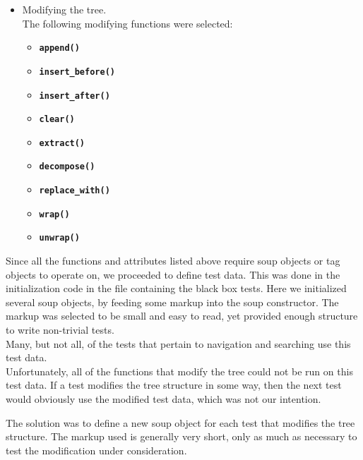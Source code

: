 \documentclass[10pt]{article}
\newcommand{\tbt}[1]{\texttt{\textbf{#1}}}
\begin{document}
\begin{itemize}
  \item Modifying the tree. \\
  The following modifying functions were selected:
    \begin{itemize}
    \setlength\itemsep{-0.05em}
      \item \tbt{append()}
      \item \tbt{insert\_before()}
      \item \tbt{insert\_after()}
      \item \tbt{clear()}
      \item \tbt{extract()}
      \item \tbt{decompose()}
      \item \tbt{replace\_with()}
      \item \tbt{wrap()}
      \item \tbt{unwrap()}
    \end{itemize}
\end{itemize}


Since all the functions and attributes listed above require soup objects or tag objects to operate on, we proceeded to define test data. This was done in the initialization code in the file containing the black box tests. Here we initialized several soup objects, by feeding some markup into the soup constructor. The markup was selected to be small and easy to read, yet provided enough structure to write non-trivial tests.  \\ 

Many, but not all, of the tests that pertain to navigation and searching use this test data. \\

Unfortunately, all of the functions that modify the tree could not be run on this test data. If a test modifies the tree structure in some way, then the next test would obviously use the modified test data, which was not our intention.

The solution was to define a new soup object for each test that modifies the tree structure. The markup used is generally very short, only as much as necessary to test the modification under consideration. \\
\end{document}

